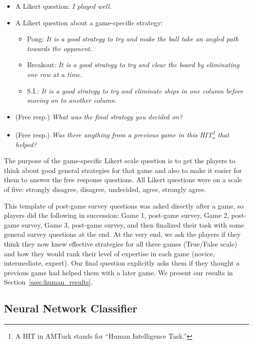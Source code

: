 \documentclass[letterpaper, 10 pt, conference]{ieeeconf}  %
\begin{document}
\begin{itemize}
    \item A Likert question: \emph{I played well.}
    \item A Likert question about a game-specific strategy:
    \begin{itemize}
        \item Pong: \emph{It is a good strategy to try and make the ball take an angled path towards the opponent.}
        \item Breakout: \emph{It is a good strategy to try and clear the board by eliminating one row at a time.}
        \item S.I.: \emph{It is a good strategy to try and eliminate ships in one column before moving on to another column.}
    \end{itemize}
    \item (Free resp.) \emph{What was the final strategy you decided on?}
    \item (Free resp.) \emph{Was there anything from a previous game in this HIT\footnote{A HIT in AMTurk stands
    for ``Human Intelligence Task.''} that helped?}
\end{itemize}

The purpose of the game-specific Likert scale question is to get the players to think about good
general strategies for that game and also to make it easier for them to answer the free response
questions. All Likert questions were on a scale of five: strongly disagree, disagree, undecided,
agree, strongly agree.

This template of post-game survey questions was asked directly after a game, so players did the
following in succession: Game 1, post-game survey, Game 2, post-game survey, Game 3, post-game
survey, and then finalized their task with some general survey questions at the end. At the very
end, we ask the players if they think they now knew effective strategies for all three games
(True/False scale) and how they would rank their level of expertise in each game (novice,
intermediate, expert).  Our final question explicitly asks them if they thought a previous game had
helped them with a later game. We present our results in Section~\ref{ssec:human_results}.

\subsection{Neural Network Classifier}\label{ssec:nn_experiment}
\end{document}

